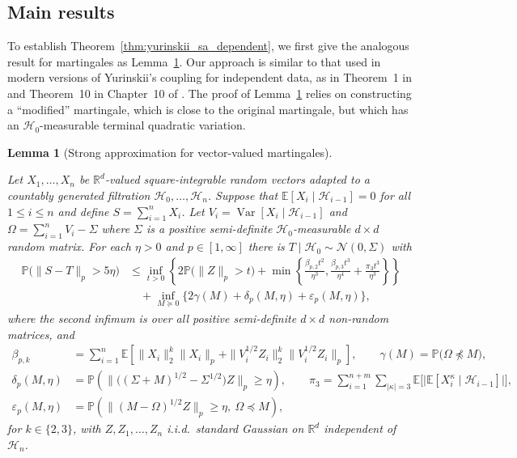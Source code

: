 \documentclass[11pt,lof]{puthesis}
\renewcommand{\P}{\ensuremath{\mathbb{P}}}
\newcommand{\R}{\ensuremath{\mathbb{R}}}
\newcommand{\E}{\ensuremath{\mathbb{E}}}
\newcommand{\cH}{\ensuremath{\mathcal{H}}}
\newcommand{\cN}{\ensuremath{\mathcal{N}}}
\DeclareMathOperator{\Var}{Var}
\theoremstyle{break}
\newtheorem{lemma}{Lemma}[section]
\theoremstyle{proof}
\begin{document}
\subsection{Main results}

To establish Theorem~\ref{thm:yurinskii_sa_dependent}, we first
give the analogous result
for martingales as Lemma~\ref{lem:yurinskii_app_sa_martingale}. Our approach is
similar to
that used in modern versions of Yurinskii's coupling for independent data, as
in Theorem~1 in \citet{lecam1988} and Theorem~10 in Chapter~10 of
\citet{pollard2002user}. The proof of
Lemma~\ref{lem:yurinskii_app_sa_martingale} relies on
constructing a ``modified'' martingale, which is close to the original
martingale, but which has an $\cH_0$-measurable terminal quadratic variation.

\begin{lemma}[Strong approximation for vector-valued martingales]%
\label{lem:yurinskii_app_sa_martingale}

Let $X_1, \ldots, X_n$ be $\R^d$-valued
square-integrable random vectors
adapted to a countably generated
filtration $\cH_0, \ldots, \cH_n$.
Suppose that
$\E[X_i \mid \cH_{i-1}] = 0$ for all $1 \leq i \leq n$
and define $S = \sum_{i=1}^n X_i$.
Let $V_i = \Var[X_i \mid \cH_{i-1}]$ and
$\Omega = \sum_{i=1}^n V_i - \Sigma$
where $\Sigma$ is a positive semi-definite
$\cH_0$-measurable $d \times d$ random matrix.
For each $\eta > 0$ and $p \in [1,\infty]$
there is $T \mid \cH_0 \sim \cN(0, \Sigma)$ with
%
\begin{align*}
\P\big(\|S-T\|_p > 5\eta\big)
&\leq
\inf_{t>0}
\left\{
2 \P\big( \|Z\|_p > t \big)
+ \min\left\{
\frac{\beta_{p,2} t^2}{\eta^3},
\frac{\beta_{p,3} t^3}{\eta^4}
+ \frac{\pi_3 t^3}{\eta^3}
\right\}
\right\} \\
\nonumber
&\quad+
\inf_{M \succeq 0}
\big\{ 2\gamma(M) + \delta_p(M,\eta)
+ \varepsilon_p(M, \eta)\big\},
\end{align*}
%
where the second infimum is over all positive semi-definite
$d \times d$ non-random matrices, and
%
\begin{align*}
\beta_{p,k}
&=
\sum_{i=1}^n \E\left[\| X_i \|^k_2 \| X_i \|_p
+ \|V_i^{1/2} Z_i \|^k_2 \|V_i^{1/2} Z_i \|_p \right],
\qquad\gamma(M)
= \P\big(\Omega \npreceq M\big), \\
\delta_p(M,\eta)
&=
\P\left(
\big\|\big((\Sigma +M)^{1/2}- \Sigma^{1/2}\big) Z\big\|_p
\geq \eta
\right),
\qquad\pi_3
=
\sum_{i=1}^{n+m}
\sum_{|\kappa| = 3}
\E \Big[ \big|
\E \left[ X_i^\kappa \mid \cH_{i-1} \right]
\big| \Big], \\
\varepsilon_p(M, \eta)
&=
\P\left(\big\| (M - \Omega)^{1/2} Z \big\|_p\geq \eta, \
\Omega \preceq M\right),
\end{align*}
%
for $k \in \{2,3\}$, with $Z, Z_1,\dots ,Z_n$ i.i.d.\ standard Gaussian
on $\R^d$ independent of $\cH_n$.
\end{lemma}
\end{document}
